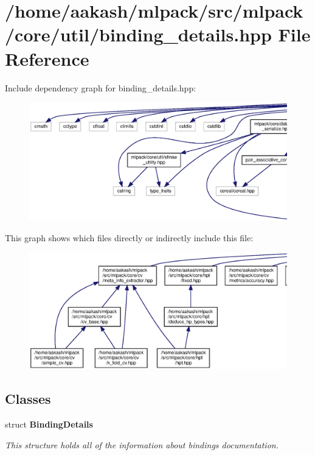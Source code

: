 \section{/home/aakash/mlpack/src/mlpack/core/util/binding\+\_\+details.hpp File Reference}
\label{binding__details_8hpp}
Include dependency graph for binding\+\_\+details.\+hpp\+:
\nopagebreak
\begin{figure}[H]
\begin{center}
\leavevmode
\includegraphics[width=350pt]{binding__details_8hpp__incl}
\end{center}
\end{figure}
This graph shows which files directly or indirectly include this file\+:
\nopagebreak
\begin{figure}[H]
\begin{center}
\leavevmode
\includegraphics[width=350pt]{binding__details_8hpp__dep__incl}
\end{center}
\end{figure}
\subsection*{Classes}
\begin{DoxyCompactItemize}
\item 
struct \textbf{ Binding\+Details}
\begin{DoxyCompactList}\small\item\em This structure holds all of the information about bindings documentation. \end{DoxyCompactList}\end{DoxyCompactItemize}
